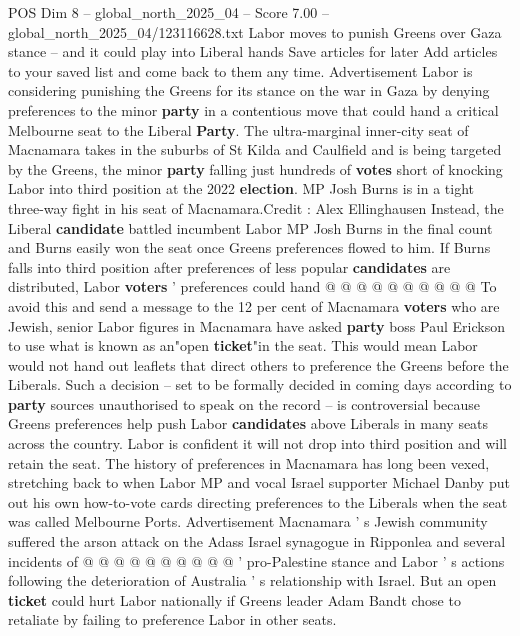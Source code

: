 \begin{textsample}{POS Dim 8 – global\_north\_2025\_04 – Score 7.00 – global\_north\_2025\_04/123116628.txt}  \label{ex:f8_pos_376}
Labor moves to punish Greens over Gaza stance -- and it could play into Liberal hands Save articles for later Add articles to your saved list and come back to them any time.
Advertisement Labor is considering punishing the Greens for its stance on the war in Gaza by denying preferences to the minor \textbf{party} in a contentious move that could hand a critical Melbourne seat to the Liberal \textbf{Party}.
The ultra-marginal inner-city seat of Macnamara takes in the suburbs of St Kilda and Caulfield and is being targeted by the Greens, the minor \textbf{party} falling just hundreds of \textbf{votes} short of knocking Labor into third position at the 2022 \textbf{election}.
MP Josh Burns is in a tight three-way fight in his seat of Macnamara.Credit : Alex Ellinghausen Instead, the Liberal \textbf{candidate} battled incumbent Labor MP Josh Burns in the final count and Burns easily won the seat once Greens preferences flowed to him.
If Burns falls into third position after preferences of less popular \textbf{candidates} are distributed, Labor \textbf{voters} ' preferences could hand @ @ @ @ @ @ @ @ @ @ To avoid this and send a message to the 12 per cent of Macnamara \textbf{voters} who are Jewish, senior Labor figures in Macnamara have asked \textbf{party} boss Paul Erickson to use what is known as an"open \textbf{ticket}"in the seat.
This would mean Labor would not hand out leaflets that direct others to preference the Greens before the Liberals.
Such a decision -- set to be formally decided in coming days according to \textbf{party} sources unauthorised to speak on the record -- is controversial because Greens preferences help push Labor \textbf{candidates} above Liberals in many seats across the country.
Labor is confident it will not drop into third position and will retain the seat.
The history of preferences in Macnamara has long been vexed, stretching back to when Labor MP and vocal Israel supporter Michael Danby put out his own how-to-vote cards directing preferences to the Liberals when the seat was called Melbourne Ports.
Advertisement Macnamara ' s Jewish community suffered the arson attack on the Adass Israel synagogue in Ripponlea and several incidents of @ @ @ @ @ @ @ @ @ @ ' pro-Palestine stance and Labor ' s actions following the deterioration of Australia ' s relationship with Israel.
But an open \textbf{ticket} could hurt Labor nationally if Greens leader Adam Bandt chose to retaliate by failing to preference Labor in other seats.

\end{textsample}

